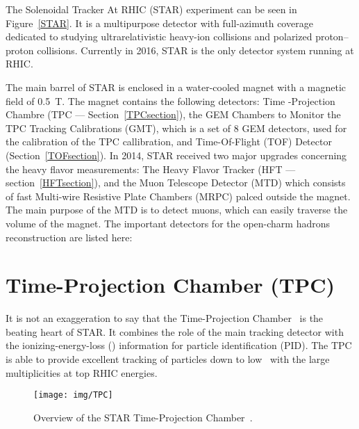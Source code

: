 The Solenoidal Tracker At RHIC (STAR) experiment \cite{STARoverview} can be seen in Figure~\ref{STAR}. It is a multipurpose detector with full-azimuth
coverage dedicated to
studying ultrarelativistic heavy-ion collisions and polarized proton--proton collisions. Currently in 2016, STAR is the
only detector system running at RHIC\@.

The main barrel of STAR is enclosed in a water-cooled magnet with a magnetic field of \SI{0.5}{\tesla}. The magnet contains the
following detectors: Time -Projection Chambre (TPC --- Section~\ref{TPCsection}), the GEM
Chambers to Monitor the TPC Tracking Calibrations (GMT), 
which is a set of 8 GEM detectors, used for the calibration of the TPC callibration, and Time-Of-Flight
(TOF) Detector (Section~\ref{TOFsection}). In 2014, STAR received two major upgrades
concerning the heavy flavor measurements: The Heavy Flavor Tracker (HFT --- section~\ref{HFTsection}), and the Muon Telescope Detector (MTD) which consists of fast Multi-wire Resistive Plate Chambers (MRPC) palced
outside the magnet. The main purpose of the MTD is to detect muons, which can easily traverse the volume of the magnet. The important
detectors for the open-charm hadrons reconstruction are listed here:
\section{Time-Projection Chamber (TPC)\label{TPCsection}} 
It is not an exaggeration to say that the Time-Projection Chamber~\cite{TpcNim} is the beating heart of STAR. It combines the role of the main tracking detector with the ionizing-energy-loss
(\dedx) information for particle identification (PID). The TPC is able to provide excellent tracking of particles down to low \pt\ with the large multiplicities at top RHIC energies.

\begin{figure}[htb]
\begin{center}
 \texttt{[image: img/TPC]}\\
\end{center}
\caption{\label{TPC}Overview of the STAR Time-Projection Chamber~\cite{TpcNim}.}
\end{figure}


